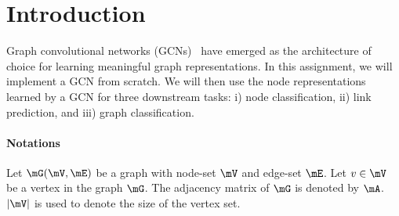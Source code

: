 \section{Introduction}
Graph convolutional networks (GCNs)~\cite{kipf2016semi} have emerged as the architecture of choice for learning meaningful graph representations. 
In this assignment, we will implement a GCN from scratch.
We will then use the node representations learned by a GCN for three downstream tasks: i) node classification, ii) link prediction, and iii) graph classification.


\paragraph{Notations}
Let $\mG(\mV, \mE)$ be a graph with node-set $\mV$ and edge-set $\mE$. Let $v \in \mV$ be a vertex in the graph $\mG$.
The adjacency matrix of $\mG$ is denoted by $\mA$.
$|\mV|$ is used to denote the size of the vertex set.


